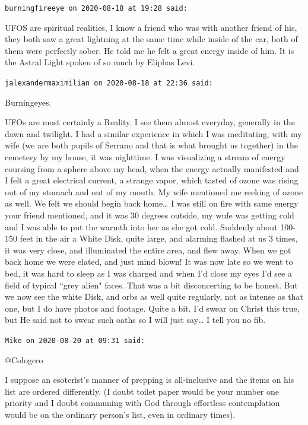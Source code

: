 \begin{footnotesize}
\begin{sffamily}
\begin{quotex}
\end{quotex}

\hfill

\texttt{burningfireeye on 2020-08-18 at 19:28 said: }

UFOS are spiritual realities, I know a friend who was with another friend of his, they both saw a great lightning at the same time while inside of the car, both of them were perfectly sober. He told me he felt a great energy inside of him. It is the Astral Light spoken of so much by Eliphas Levi.


\hfill

\texttt{jalexandermaximilian on 2020-08-18 at 22:36 said: }

Burningeyes.

UFOs are most certainly a Reality. I see them almost everyday, generally in the dawn and twilight. I had a similar experience in which I was meditating, with my wife (we are both pupils of Serrano and that is what brought us together) in the cemetery by my house, it was nighttime. I was visualizing a stream of energy coursing from a sphere above my head, when the energy actually manifested and I felt a great electrical current, a strange vapor, which tasted of ozone was rising out of my stomach and out of my mouth. My wife mentioned me reeking of ozone as well. We felt we should begin back home… I was still on fire with same energy your friend mentioned, and it was 30 degrees outside, my wufe was getting cold and I was able to put the warmth into her as she got cold. Suddenly about 100-150 feet in the air a White Disk, quite large, and alarming flashed at us 3 times, it was very close, and illuminated the entire area, and flew away. When we got back home we were elated, and just mind blown! It was now late so we went to bed, it was hard to sleep as I was charged and when I'd close my eyes I'd see a field of typical ``grey alien" faces. That was a bit disconcerting to be honest. But we now see the white Disk, and orbs as well quite regularly, not as intense as that one, but I do have photos and footage. Quite a bit. I'd swear on Christ this true, but He said not to swear such oaths so I will just say… I tell you no fib.


\hfill

\texttt{Mike on 2020-08-20 at 09:31 said: }

@Cologero

I suppose an esoterist's manner of prepping is all-inclusive and the items on his list are ordered differently. (I doubt toilet paper would be your number one priority and I doubt communing with God through effortless contemplation would be on the ordinary person's list, even in ordinary times).


\end{sffamily}
\end{footnotesize}

